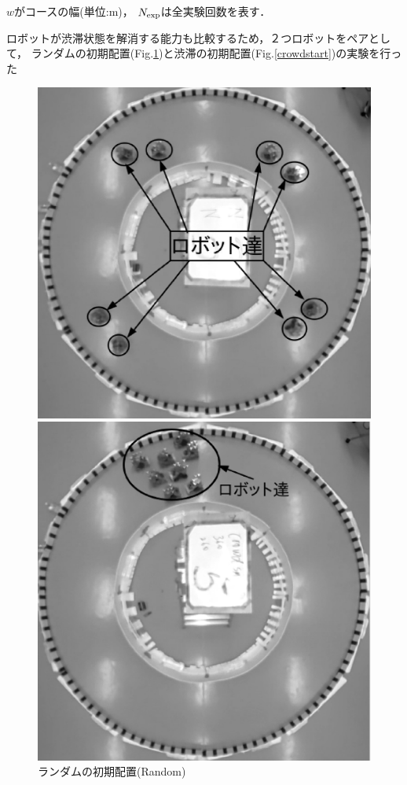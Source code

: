 $w$がコースの幅(単位:m)，
$N_{\rm exp}$は全実験回数を表す．

ロボットが渋滞状態を解消する能力も比較するため，２つロボットをペアとして，
ランダムの初期配置(Fig.\ref{randstart})と渋滞の初期配置(Fig.\ref{crowdstart})の実験を行った



\vspace{-1mm}
\begin{figure}[h]
    \begin{minipage}{0.49\linewidth}
        \centering
        \includegraphics[width=1.0\linewidth]{startrand.eps}
        \caption{ランダムの初期配置(Random)}
        \label{randstart}
    \end{minipage}
    \begin{minipage}{0.49\linewidth}
        \centering
        \includegraphics[width=1.0\linewidth]{start_crowd.eps}

\end{minipage}
\end{figure}
